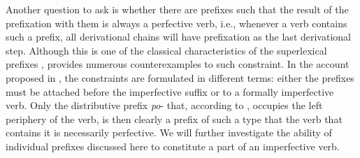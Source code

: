 Another question to ask is whether there are prefixes such that the result of the prefixation with them is always a perfective verb, i.e., whenever a verb contains such a prefix, all derivational chains will have prefixation as the last derivational step. Although this is one of the classical characteristics of the superlexical prefixes \citep[see, e.g.][]{Ramchand:04, Svenonius:04a, Romanova:06}, \citet{Tatevosov:07, Tatevosov:09} provides numerous counterexamples to such constraint. In the account proposed in \citealt{Tatevosov:09}, the constraints are formulated in different terms: either the prefixes must be attached before the imperfective suffix or to a formally imperfective verb. Only the distributive prefix \textit{po}- that, according to \citet{Tatevosov:09}, occupies the left periphery of the verb, is then clearly a prefix of such a type that the verb that contains it is necessarily perfective. We will further investigate the ability of individual prefixes discussed here to constitute a part of an imperfective verb.
